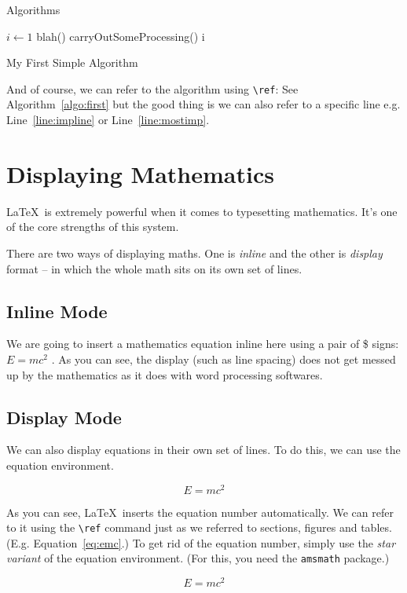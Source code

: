\documentclass{beamer}
\begin{document}
\begin{frame}{Algorithms}
\begin{algorithm}[H]
	\begin{algorithmic}[2]
		\STATE $i\gets1$
		\ELSE 
		 \label{line:impline}
		\STATE blah()
		\STATE carryOutSomeProcessing() \label{line:mostimp}
		\ENDFOR
		\ENDIF
		\ENDIF
		\RETURN i
	\end{algorithmic}
	\caption{My First Simple Algorithm}
	\label{algo:first}
\end{algorithm}
\end{frame}
\begin{frame}
And of course, we can refer to the algorithm using \Verb|\ref|: See Algorithm~\ref{algo:first} but the good thing is we can also refer to a specific line e.g. Line~\ref{line:impline} or Line~\ref{line:mostimp}.
\end{frame}


\section{Displaying Mathematics}

\begin{frame}
\LaTeX\ is extremely powerful when it comes to typesetting mathematics. It's one of the core strengths of this system. 

There are two ways of displaying maths. One is \emph{inline} and the other is \emph{display} format -- in which the whole math sits on its own set of lines.

\subsection{Inline Mode}
We are going to insert a mathematics equation inline here using a pair of \$ signs: $E=mc^2$   . As you can see, the display (such as line spacing) does not get messed up by the mathematics as it does with word processing softwares. 
\end{frame}

\begin{frame}
\subsection{Display Mode}
We can also display equations in their own set of lines. To do this, we can use the equation environment. 

\begin{equation}\label{eq:emc}
E=mc^2
\end{equation}

As you can see, \LaTeX\ inserts the equation number automatically. We can refer to it using the \Verb|\ref| command just as we referred to sections, figures and tables. (E.g. Equation~\ref{eq:emc}.) To get rid of the equation number, simply use the \emph{star variant} of the equation environment. (For this, you need the \texttt{amsmath} package.)

\begin{equation*}
E=mc^2
\end{equation*}
\end{frame}
\end{document}
